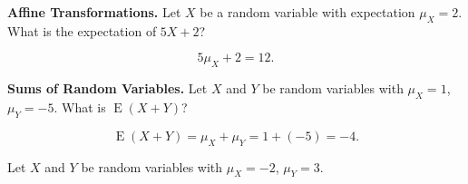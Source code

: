 \documentclass[11pt]{exam}
\DeclareMathOperator*{\E}{E}
\begin{document}
\begin{questions}
\begin{parts}


\end{parts}

\newpage


\question \textbf{Affine Transformations.}
Let $X$ be a random variable with expectation $\mu_X = 2$.  What is the
expectation of $5 X + 2$?

\begin{solution}
\[
  5 \mu_X + 2 = 12.
\]
\end{solution}


\question \textbf{Sums of Random Variables.}
Let $X$ and $Y$ be random variables with $\mu_X = 1$, 
$\mu_Y = -5$.  What is $\E(X + Y)$?

\begin{solution}
\[
  \E(X + Y) = \mu_X + \mu_Y = 1 + (-5) = -4.
\]
\end{solution}



\question Let $X$ and $Y$ be random variables with $\mu_X = -2$, $\mu_Y = 3$.

\end{questions}
\end{document}
